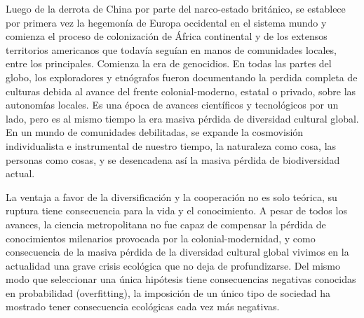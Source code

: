 \documentclass[a4paper,11pt]{book}
\theoremstyle{definition}
\begin{document}
%
Luego de la derrota de China por parte del narco-estado brit\'anico, se establece por primera vez la hegemon\'ia de Europa occidental en el sistema mundo y comienza el proceso de colonizaci\'on de África continental y de los extensos territorios americanos que todav\'ia segu\'ian en manos de comunidades locales, entre los principales.
%
Comienza la era de genocidios.
%
En todas las partes del globo, los exploradores y etn\'ografos fueron documentando la perdida completa de culturas debida al avance del frente colonial-moderno, estatal o privado, sobre las autonom\'ias locales.
Es una época de avances cient\'ificos y tecnol\'ogicos por un lado, pero es al mismo tiempo la era masiva pérdida de diversidad cultural global.
%
%
%
En un mundo de comunidades debilitadas, se expande la cosmovisión individualista e instrumental de nuestro tiempo, la naturaleza como cosa, las personas como cosas, y se desencadena así la masiva p\'erdida de biodiversidad actual.


La ventaja a favor de la diversificación y la cooperación no es solo teórica, su ruptura tiene consecuencia para la vida y el conocimiento.
%
A pesar de todos los avances, la ciencia metropolitana no fue capaz de compensar la pérdida de conocimientos milenarios provocada por la colonial-modernidad, y como consecuencia de la masiva pérdida de la diversidad cultural global vivimos en la actualidad una grave crisis ecológica que no deja de profundizarse.
Del mismo modo que seleccionar una única hipótesis tiene consecuencias negativas conocidas en probabilidad (overfitting), la imposición de un único tipo de sociedad ha mostrado tener consecuencia ecológicas cada vez más negativas.

\end{document}
